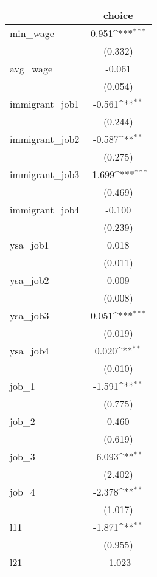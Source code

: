 {
\def\sym#1{\ifmmode^{#1}\else\(^{#1}\)\fi}
\begin{tabular}{l*{1}{c}}
\hline\hline
            &\multicolumn{1}{c}{choice}\\
\hline
min\_wage    &       0.951\sym{***}\\
            &     (0.332)         \\
avg\_wage    &      -0.061         \\
            &     (0.054)         \\
immigrant\_job1&      -0.561\sym{**} \\
            &     (0.244)         \\
immigrant\_job2&      -0.587\sym{**} \\
            &     (0.275)         \\
immigrant\_job3&      -1.699\sym{***}\\
            &     (0.469)         \\
immigrant\_job4&      -0.100         \\
            &     (0.239)         \\
ysa\_job1    &       0.018         \\
            &     (0.011)         \\
ysa\_job2    &       0.009         \\
            &     (0.008)         \\
ysa\_job3    &       0.051\sym{***}\\
            &     (0.019)         \\
ysa\_job4    &       0.020\sym{**} \\
            &     (0.010)         \\
job\_1       &      -1.591\sym{**} \\
            &     (0.775)         \\
job\_2       &       0.460         \\
            &     (0.619)         \\
job\_3       &      -6.093\sym{**} \\
            &     (2.402)         \\
job\_4       &      -2.378\sym{**} \\
            &     (1.017)         \\
l11         &      -1.871\sym{**} \\
            &     (0.955)         \\
l21         &      -1.023         \\

\end{tabular}}
